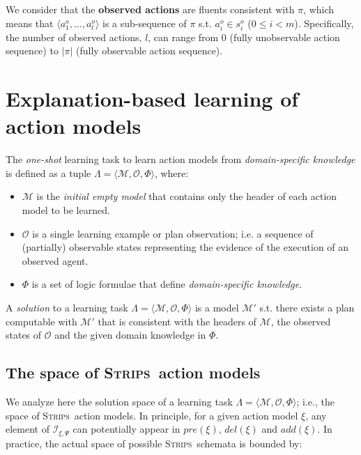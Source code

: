 \documentclass[runningheads]{llncs}
\newcommand{\tup}[1]{{\langle #1 \rangle}}
\newcommand{\strips}{\textsc{Strips}}     %
\begin{document}
We consider that the {\bf observed actions} are fluents consistent with $\pi$, which means that $\tup{a_1^o, \ldots, a_l^o}$ is a sub-sequence of $\pi$ s.t. $a_i^o\in s_i^o$ ({\small $0\leq i <m$}).  Specifically, the number of observed actions, $l$, can range from $0$ (fully unobservable action sequence) to $|\pi|$ (fully observable action sequence).



\section{Explanation-based learning of action models}
The {\em one-shot} learning task to learn action models from {\em domain-specific knowledge} is defined as a tuple $\Lambda=\tup{\mathcal{M},{\mathcal O},\Phi}$, where:

\begin{itemize}
\item $\mathcal{M}$ is the {\em initial empty model} that contains only the header of each action model to be learned.
\item $\mathcal{O}$ is a single learning example or plan observation; i.e. a sequence of (partially) observable states representing the evidence of the execution of an observed agent.
\item $\Phi$ is a set of logic formulae that define {\em domain-specific knowledge}.
\end{itemize}

A {\em solution} to a learning task $\Lambda=\tup{\mathcal{M},{\mathcal O},\Phi}$ is a model $\mathcal{M}'$ s.t. there exists a plan computable with $\mathcal{M}'$ that is consistent with the headers of $\mathcal{M}$, the observed states of $\mathcal{O}$ and the given domain knowledge in $\Phi$.


\subsection{The space of \strips\ action models}

We analyze here the solution space of a learning task $\Lambda=\tup{\mathcal{M},{\mathcal O},\Phi}$; i.e., the space of \strips\ action models. In principle, for a given action model $\xi$, any element of ${\mathcal I}_{\xi,\Psi}$ can potentially appear in $pre(\xi)$, $del(\xi)$ and $add(\xi)$. In practice, the actual space of possible \strips\ schemata is bounded by:
\end{document}
